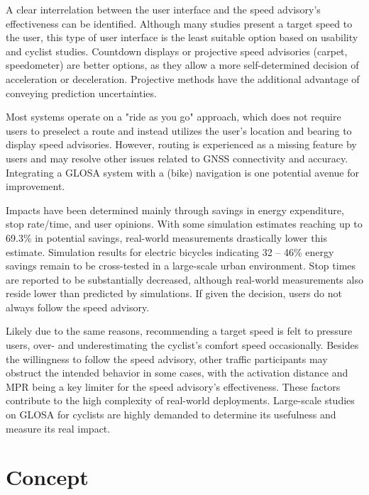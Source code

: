 \begin{Summary}
A clear interrelation between the user interface and the speed advisory's effectiveness can be identified. Although many studies present a target speed to the user, this type of user interface is the least suitable option based on usability and cyclist studies. Countdown displays or projective speed advisories (carpet, speedometer) are better options, as they allow a more self-determined decision of acceleration or deceleration. Projective methods have the additional advantage of conveying prediction uncertainties. 

Most systems operate on a "ride as you go" approach, which does not require users to preselect a route and instead utilizes the user's location and bearing to display speed advisories. However, routing is experienced as a missing feature by users and may resolve other issues related to GNSS connectivity and accuracy. Integrating a GLOSA system with a (bike) navigation is one potential avenue for improvement.

Impacts have been determined mainly through savings in energy expenditure, stop rate/time, and user opinions. With some simulation estimates reaching up to 69.3\% in potential savings, real-world measurements drastically lower this estimate. Simulation results for electric bicycles indicating 32 -- 46\% energy savings remain to be cross-tested in a large-scale urban environment. Stop times are reported to be substantially decreased, although real-world measurements also reside lower than predicted by simulations. If given the decision, users do not always follow the speed advisory.

Likely due to the same reasons, recommending a target speed is felt to pressure users, over- and underestimating the cyclist's comfort speed occasionally. Besides the willingness to follow the speed advisory, other traffic participants may obstruct the intended behavior in some cases, with the activation distance and MPR being a key limiter for the speed advisory's effectiveness. These factors contribute to the high complexity of real-world deployments. Large-scale studies on GLOSA for cyclists are highly demanded to determine its usefulness and measure its real impact.
\end{Summary}

\section{Concept}

